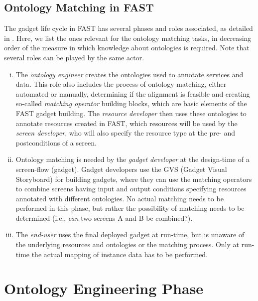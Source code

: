 \subsection{Ontology Matching in FAST}
\label{ominfast}

The gadget life cycle in FAST has several phases and roles associated, as detailed in \cite{hoyer-fast}. Here, we list the ones relevant for the ontology matching tasks, in decreasing order of the measure in which knowledge about ontologies is required. Note that several roles can be played by the same actor.
\begin{enumerate}[(i)]
    \item The \textit{ontology engineer} creates the ontologies used to annotate services and data. This role also includes the process of ontology matching, either automated or manually, determining if the alignment is feasible and creating so-called \emph{matching operator} building blocks, which are basic elements of the FAST gadget building. The \textit{resource developer} then uses these ontologies to annotate resources created in FAST, which resources will be used by the \textit{screen developer}, who will also specify the resource type at the pre- and postconditions of a screen.
    \item Ontology matching is needed by the \textit{gadget developer} at the design-time of a screen-flow (gadget). Gadget developers use the GVS (Gadget Visual Storyboard) for building gadgets, where they can use the matching operators to combine screens having input and output conditions specifying resources annotated with different ontologies. No actual matching needs to be performed in this phase, but rather the possibility of matching needs to be determined (i.e., \emph{can} two screens A and B be combined?).
    \item The \textit{end-user} uses the final deployed gadget at run-time, but is unaware of the underlying resources and ontologies or the matching process. Only at run-time the actual mapping of instance data has to be performed.
\end{enumerate}


\section{Ontology Engineering Phase}
\label{sec:ontologyengineering}

